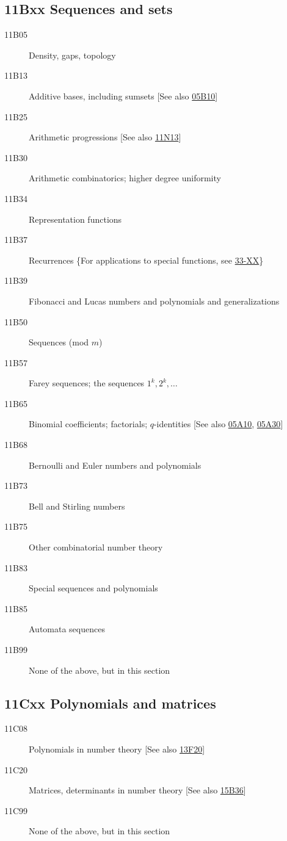 \subsection*{11Bxx  Sequences and sets }\label{11Bxx}
\begin{description}
\item [11B05]\label{11B05} Density, gaps, topology
\item [11B13]\label{11B13} Additive bases, including sumsets [See also \hyperref[05B10]{05B10}]
\item [11B25]\label{11B25} Arithmetic progressions [See also \hyperref[11N13]{11N13}]
\item [11B30]\label{11B30} Arithmetic combinatorics; higher degree uniformity
\item [11B34]\label{11B34} Representation functions
\item [11B37]\label{11B37} Recurrences \{For applications to special functions, see \hyperref[33-XX]{33-XX}\}
\item [11B39]\label{11B39} Fibonacci and Lucas numbers and polynomials and generalizations
\item [11B50]\label{11B50} Sequences (mod $m$)
\item [11B57]\label{11B57} Farey sequences; the sequences $1^k, 2^k, \dots$
\item [11B65]\label{11B65} Binomial coefficients; factorials; $q$-identities [See also \hyperref[05A10]{05A10}, \hyperref[05A30]{05A30}]
\item [11B68]\label{11B68} Bernoulli and Euler numbers and polynomials
\item [11B73]\label{11B73} Bell and Stirling numbers
\item [11B75]\label{11B75} Other combinatorial number theory
\item [11B83]\label{11B83} Special sequences and polynomials
\item [11B85]\label{11B85} Automata sequences
\item [11B99]\label{11B99} None of the above, but in this section
\end{description}
\subsection*{11Cxx  Polynomials and matrices }\label{11Cxx}
\begin{description}  
\item [11C08]\label{11C08} Polynomials in number theory [See also \hyperref[13F20]{13F20}]
\item [11C20]\label{11C20} Matrices, determinants in number theory [See also \hyperref[15B36]{15B36}]
\item [11C99]\label{11C99} None of the above, but in this section
\end{description}
